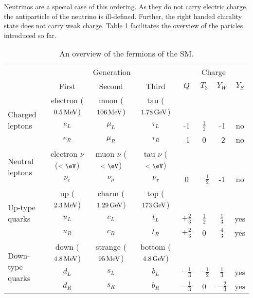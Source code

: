 Neutrinos are a special case of this ordering. 
As they do not carry electric charge, the antiparticle of the neutrino is ill-defined. 
Further, the right handed chirality state does not carry weak charge. 
Table \ref{tab:fermions} facilitates the overview of the paricles introduced so far.
\begin{table}[ht!]
\def\arraystretch{1.2}
\setlength{\belowcaptionskip}{6pt}
\small
\centering
\caption{An overview of the fermions of the SM.}
\label{tab:fermions}
\begin{tabular}{l c c c c c c c}
        \hline \hline
        & \multicolumn{3}{c}{Generation} &\multicolumn{4}{c}{Charge} \\
        & First & Second & Third & $Q$ & $T_{3}$ & $Y_{W}$ & $Y_{S}$ \\\hline
\multirow{3}{*}{Charged leptons}& electron ($0.5\,\text{Me\hspace{-.08em}V}$) & muon ($106\,\text{Me\hspace{-.08em}V}$) & tau ($1.78\,\text{Ge\hspace{-.08em}V}$)&  & & & \\
                        & $e_{L}$ & $\mu_{L}$ & $\tau_{L}$ & -1 & $\frac{1}{2}$ & -1 & no\\
                        & $e_{R}$ & $\mu_{R}$ & $\tau_{R}$ & -1 & 0             & -2 & no\\\hline
\multirow{2}{*}{Neutral leptons}& electron $\nu$ ($<\eV$)& muon $\nu$ ($<\eV$)& tau $\nu$ ($<\eV$)&  & & & \\
                        & $\nu_{e}$ & $\nu_{\mu}$ & $\nu_{\tau}$ & 0 & $-\frac{1}{2}$ & -1 & no\\\hline
\multirow{3}{*}{Up-type quarks} & up ($2.3\,\text{Me\hspace{-.08em}V}$)& charm ($1.29\,\text{Ge\hspace{-.08em}V}$)& top ($173\,\text{Ge\hspace{-.08em}V}$)&  & & & \\
                        & $u_{L}$ & $c_{L}$ & $t_{L}$ & $+\frac{2}{3}$ & $\frac{1}{2}$ & $\frac{1}{3}$ & yes\\
                        & $u_{R}$ & $c_{R}$ & $t_{R}$ & $+\frac{2}{3}$ & 0 & $\frac{4}{3}$ & yes\\\hline
\multirow{3}{*}{Down-type quarks} & down ($4.8\,\text{Me\hspace{-.08em}V}$)& strange ($95\,\text{Me\hspace{-.08em}V}$)& bottom ($4.8\,\text{Ge\hspace{-.08em}V}$)&  & & & \\
                        & $d_{L}$ & $s_{L}$ & $b_{L}$ & $-\frac{1}{3}$ & $-\frac{1}{2}$ & $\frac{1}{3}$ & yes\\
                        & $d_{R}$ & $s_{R}$ & $b_{R}$ & $-\frac{1}{3}$ & 0 & $-\frac{2}{3}$ & yes\\\hline
\hline
\end{tabular}
\end{table}                                                                                                              
